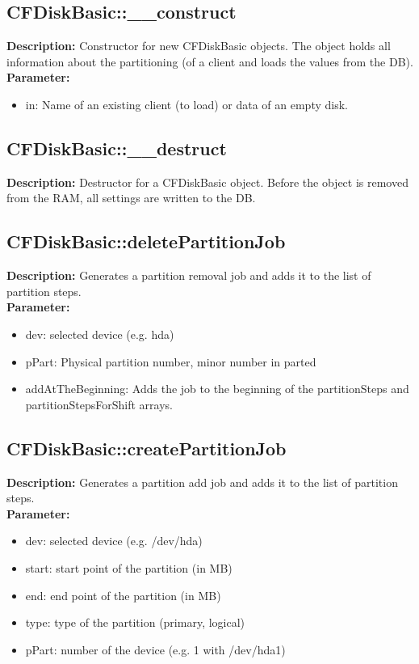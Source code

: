\subsection{CFDiskBasic::\_\_construct}
\textbf{Description:} Constructor for new CFDiskBasic objects. The object holds all information about the partitioning (of a client and loads the values from the DB).\\
\textbf{Parameter:}
\begin{itemize}
\item in: Name of an existing client (to load) or data of an empty disk.
\end{itemize}

\subsection{CFDiskBasic::\_\_destruct}
\textbf{Description:} Destructor for a CFDiskBasic object. Before the object is removed from the RAM, all settings are written to the DB.\\

\subsection{CFDiskBasic::deletePartitionJob}
\textbf{Description:} Generates a partition removal job and adds it to the list of partition steps.\\
\textbf{Parameter:}
\begin{itemize}
\item dev: selected device (e.g. hda)
\item pPart: Physical partition number, minor number in parted
\item addAtTheBeginning: Adds the job to the beginning of the partitionSteps and partitionStepsForShift arrays.
\end{itemize}

\subsection{CFDiskBasic::createPartitionJob}
\textbf{Description:} Generates a partition add job and adds it to the list of partition steps.\\
\textbf{Parameter:}
\begin{itemize}
\item dev: selected device (e.g. /dev/hda)
\item start: start point of the partition (in MB)
\item end: end point of the partition (in MB)
\item type: type of the partition (primary, logical)
\item pPart: number of the device (e.g. 1 with /dev/hda1)
\end{itemize}

